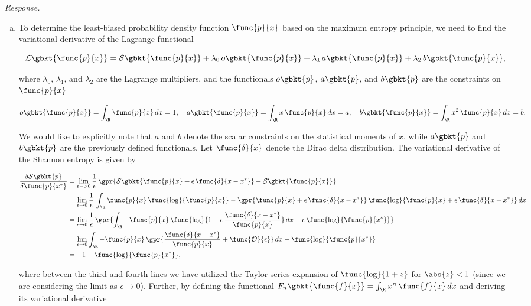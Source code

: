 \textit{Response.}

\begin{enumerate}[(a)]

	\item To determine the least-biased probability density function $\func{p}{x}$ based on the maximum entropy principle, we need to find the variational derivative of the Lagrange functional
	
	$$\mathcal{L}\gbkt{\func{p}{x}} = \mathcal{S}\gbkt{\func{p}{x}} + \lambda_0\,o\gbkt{\func{p}{x}} + \lambda_1\,a\gbkt{\func{p}{x}} + \lambda_2\,b\gbkt{\func{p}{x}},$$
	
	where $\lambda_0$, $\lambda_1$, and $\lambda_2$ are the Lagrange multipliers, and the functionals $o\gbkt{p}$, $a\gbkt{p}$, and $b\gbkt{p}$ are the constraints on $\func{p}{x}$
	
	$$o\gbkt{\func{p}{x}} = \int_{\R} \func{p}{x}\,dx = 1,\quad a\gbkt{\func{p}{x}} = \int_{\R} x\,\func{p}{x}\,dx = a,\quad b\gbkt{\func{p}{x}} = \int_{\R} x^2\,\func{p}{x}\,dx = b.$$
	
	We would like to explicitly note that $a$ and $b$ denote the scalar constraints on the statistical moments of $x$, while $a\gbkt{p}$ and $b\gbkt{p}$ are the previously defined functionals. Let $\func{\delta}{x}$ denote the Dirac delta distribution. The variational derivative of the Shannon entropy is given by
	
	\begin{align*}	
	\frac{\delta\mathcal{S}\gbkt{p}}{\delta\func{p}{x^*}} &= \lim_{\epsilon -> 0} \frac{1}{\epsilon}\,\gpr{\mathcal{S}\gbkt{\func{p}{x} + \epsilon\,\func{\delta}{x - x^{*}}} - \mathcal{S}\gbkt{\func{p}{x}}} \\
	&= \lim_{\epsilon \to 0} \frac{1}{\epsilon}\,\int_{\R} \func{p}{x}\,\func{\log}{\func{p}{x}} - \gpr{\func{p}{x} + \epsilon\,\func{\delta}{x - x^{*}}}\,\func{\log}{\func{p}{x} + \epsilon\,\func{\delta}{x - x^{*}}}\,dx \\
	&= \lim_{\epsilon \to 0} \frac{1}{\epsilon}\,\gpr{\int_{\R} -\func{p}{x}\,\func{\log}{1 + \epsilon\,\frac{\func{\delta}{x - x^{*}}}{\func{p}{x}}}\,dx - \epsilon\,\func{\log}{\func{p}{x^{*}}}} \\
	&= \lim_{\epsilon \to 0} \int_{\R} -\func{p}{x}\,\gpr{\frac{\func{\delta}{x - x^{*}}}{\func{p}{x}} + \func{\mathcal{O}}{\epsilon}}\,dx - \func{\log}{\func{p}{x^{*}}} \\
	&= -1 - \func{\log}{\func{p}{x^{*}}},
	\end{align*}
	
	where between the third and fourth lines we have utilized the Taylor series expansion of $\func{\log}{1 + z}$ for $\abs{z} < 1$ (since we are considering the limit as $\epsilon \to 0$). Further, by defining the functional $F_n\gbkt{\func{f}{x}} = \int_{\R} x^n\,\func{f}{x}\,dx$ and deriving its variational derivative
	

\end{enumerate}

